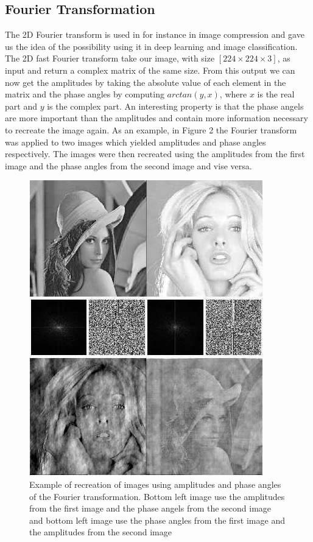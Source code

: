 \documentclass{article}
\begin{document}
\subsection{Fourier Transformation}

The 2D Fourier transform is used in for instance in image compression and gave us the idea of the possibility using it in deep learning and image classification. 
The 2D fast Fourier transform take our image, with size $[224 \times 224 \times 3]$, as input and return a complex matrix of the same size. From this output we can now get the amplitudes 
by taking the absolute value of each element in the matrix and the phase angles by computing $arctan(y, x)$, where $x$ is the real part and $y$ is the complex part. 
An interesting property is that the phase angels are more important than the amplitudes and contain more information necessary to recreate the image again. 
As an example, in Figure 2 the Fourier transform was applied to two images which yielded amplitudes and phase angles respectively. 
The images were then recreated using the amplitudes from the first image and the phase angles from the second image and vise versa. 

\begin{figure}[!htb]
	\centering
	\includegraphics[scale = 0.25]{fourier.jpg}
	\caption{Example of recreation of images using amplitudes and phase angles of the Fourier transformation. 
	Bottom left image use the amplitudes from the first image and the phase angels from the second image and 
	bottom left image use the phase angles from the first image and the amplitudes from the second image}
\end{figure}
\end{document}
